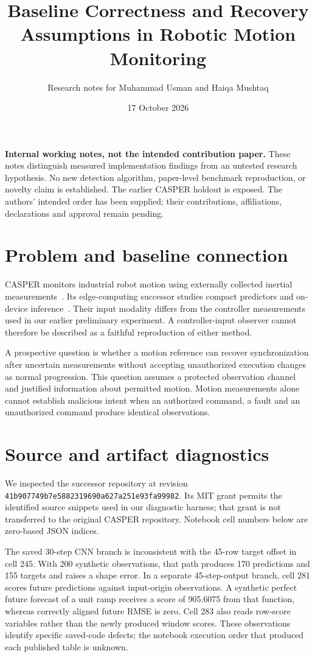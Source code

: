 \documentclass[11pt]{article}
\title{Baseline Correctness and Recovery Assumptions in Robotic Motion Monitoring}
\author{Research notes for Muhammad Usman and Haiqa Mushtaq}
\date{17 October 2026}
\begin{document}
\maketitle
\noindent\textbf{Internal working notes, not the intended contribution paper.}
These notes distinguish measured implementation findings from an untested research hypothesis. No new detection algorithm, paper-level benchmark reproduction, or novelty claim is established. The earlier CASPER holdout is exposed. The authors' intended order has been supplied; their contributions, affiliations, declarations and approval remain pending.

\section{Problem and baseline connection}
CASPER monitors industrial robot motion using externally collected inertial measurements~\cite{casper}. Its edge-computing successor studies compact predictors and on-device inference~\cite{edge}. Their input modality differs from the controller measurements used in our earlier preliminary experiment. A controller-input observer cannot therefore be described as a faithful reproduction of either method.

A prospective question is whether a motion reference can recover synchronization after uncertain measurements without accepting unauthorized execution changes as normal progression. This question assumes a protected observation channel and justified information about permitted motion. Motion measurements alone cannot establish malicious intent when an authorized command, a fault and an unauthorized command produce identical observations.

\section{Source and artifact diagnostics}
We inspected the successor repository at revision \texttt{41b907749b7e5882319690a627a251e93fa99982}. Its MIT grant permits the identified source snippets used in our diagnostic harness; that grant is not transferred to the original CASPER repository. Notebook cell numbers below are zero-based JSON indices.

The saved 30-step CNN branch is inconsistent with the 45-row target offset in cell 245. With 200 synthetic observations, that path produces 170 predictions and 155 targets and raises a shape error. In a separate 45-step-output branch, cell 281 scores future predictions against input-origin observations. A synthetic perfect future forecast of a unit ramp receives a score of 905.6075 from that function, whereas correctly aligned future RMSE is zero. Cell 283 also reads row-score variables rather than the newly produced window scores. These observations identify specific saved-code defects; the notebook execution order that produced each published table is unknown.
\end{document}
